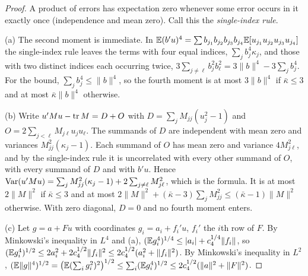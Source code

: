 \begin{proof}
A product of errors has expectation zero whenever some error occurs in it exactly once (independence
and mean zero). Call this the \emph{single-index rule}.

(a) The second moment is immediate. In
$\mathbb{E}(b'u)^4=\sum b_{j_1}b_{j_2}b_{j_3}b_{j_4}\mathbb{E}[u_{j_1}u_{j_2}u_{j_3}u_{j_4}]$ the single-index rule
leaves the terms with four equal indices, $\sum_jb_j^4\kappa_j$, and those with two distinct indices
each occurring twice, $3\sum_{j\ne\ell}b_j^2b_\ell^2=3\|b\|^4-3\sum_jb_j^4$. For the bound,
$\sum_jb_j^4\le\|b\|^4$, so the fourth moment is at most $3\|b\|^4$ if $\bar\kappa\le3$ and at most
$\bar\kappa\|b\|^4$ otherwise.

(b) Write $u'Mu-\operatorname{tr} M=D+O$ with $D=\sum_jM_{jj}(u_j^2-1)$ and $O=2\sum_{j<\ell}M_{j\ell}u_ju_\ell$.
The summands of $D$ are independent with mean zero and variances $M_{jj}^2(\kappa_j-1)$. Each summand
of $O$ has mean zero and variance $4M_{j\ell}^2$, and by the single-index rule it is uncorrelated
with every other summand of $O$, with every summand of $D$ and with $b'u$. Hence
$\operatorname{Var}(u'Mu)=\sum_jM_{jj}^2(\kappa_j-1)+2\sum_{j\ne\ell}M_{j\ell}^2$, which is the formula. It is
at most $2\|M\|^2$ if $\bar\kappa\le3$ and at most $2\|M\|^2+(\bar\kappa-3)\sum_jM_{jj}^2
\le(\bar\kappa-1)\|M\|^2$ otherwise. With zero diagonal, $D=0$ and no fourth moment enters.

(c) Let $g=a+Fu$ with coordinates $g_i=a_i+f_i'u$, $f_i'$ the $i$th row of $F$. By Minkowski's
inequality in $L^4$ and (a), $(\mathbb{E} g_i^4)^{1/4}\le|a_i|+c_4^{1/4}\|f_i\|$, so
$(\mathbb{E} g_i^4)^{1/2}\le2a_i^2+2c_4^{1/2}\|f_i\|^2\le2c_4^{1/2}(a_i^2+\|f_i\|^2)$. By Minkowski's inequality in
$L^2$, $(\mathbb{E}\|g\|^4)^{1/2}=\big(\mathbb{E}(\sum_ig_i^2)^2\big)^{1/2}\le\sum_i(\mathbb{E} g_i^4)^{1/2}
\le2c_4^{1/2}(\|a\|^2+\|F\|^2)$.


\end{proof}
